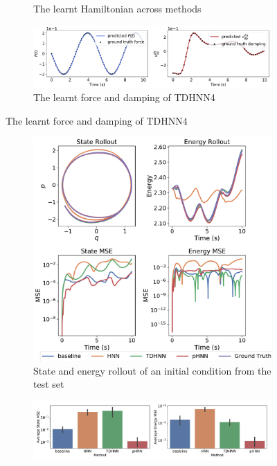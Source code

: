 \documentclass{article}
\begin{document}
\begin{figure}[!htb]
\begin{subfigure}[b]{0.48\textwidth}
\caption{The learnt Hamiltonian across methods}
\end{subfigure}
\begin{subfigure}[b]{0.48\textwidth}
\includegraphics[width=\textwidth]{figures/figures/duffing/1/duffing_dpdt_new_0.pdf}
\caption{The learnt force and damping of TDHNN4}
\end{subfigure}
\label{duffing_1_full}
\end{figure}
\begin{figure}[!htb]
\centering
\captionsetup{justification=centering}
\begin{subfigure}[b]{0.48\textwidth}
\includegraphics[width=\textwidth]{figures/figures/relativity/1/relativity_long_0.pdf}
\caption{State and energy rollout of an initial condition from the test set}
\end{subfigure}
\begin{subfigure}[b]{0.48\textwidth}
\includegraphics[width=\textwidth]{figures/figures/relativity/1/relativity_errors_0.pdf}

\end{subfigure}
\end{figure}
\end{document}
